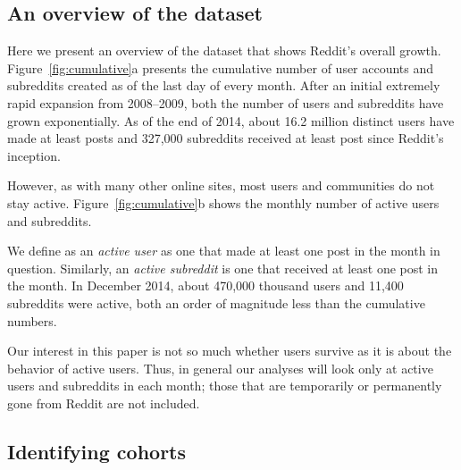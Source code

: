 \subsection{An overview of the dataset}

Here we present an overview of the dataset that shows Reddit's overall growth.  Figure~\ref{fig:cumulative}a presents the cumulative number of user accounts and subreddits created as of the last day of every month. After an initial extremely rapid expansion from 2008--2009, both the number of users and subreddits have grown exponentially.  As of the end of 2014, about 16.2 million distinct users have made at least posts and 327,000 subreddits received at least post since Reddit's inception.

However, as with many other online sites, most users \cite{} and communities \cite{butler_kraut_paper} do not stay active. Figure~\ref{fig:cumulative}b shows the monthly number of active users and subreddits.

We define as an \textit{active user} as one that made at least one post in the month in question. Similarly, an \textit{active subreddit} is one that received at least one post in the month. In December 2014, about 470,000 thousand users and 11,400 subreddits were active, both an order of magnitude less than the cumulative numbers.  

Our interest in this paper is not so much whether users survive as it is about the behavior of active users.  Thus, 
in general our analyses will look only at active users and subreddits in each month; those that are temporarily or permanently gone from Reddit are not included.  


\subsection{Identifying cohorts}

